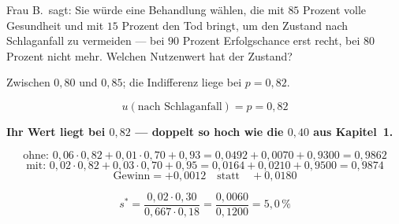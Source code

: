 \begin{aufgabe}
Frau B.\ sagt: Sie würde eine Behandlung wählen, die mit $85$ Prozent volle Gesundheit und mit $15$ Prozent den Tod bringt, um den Zustand nach Schlaganfall zu vermeiden --- bei $90$ Prozent Erfolgschance erst recht, bei $80$ Prozent nicht mehr. Welchen Nutzenwert hat der Zustand?

\loesung
{}
Zwischen $0{,}80$ und $0{,}85$; die Indifferenz liege bei $p = 0{,}82$.

\[ u(\text{nach Schlaganfall}) = p = 0{,}82 \]

\begin{center}
\begin{minipage}{0.9\textwidth}
\textbf{Ihr Wert liegt bei $0{,}82$ --- doppelt so hoch wie die $0{,}40$ aus Kapitel~1.}
\end{minipage}
\end{center}

\[ \text{ohne: } 0{,}06\cdot0{,}82 + 0{,}01\cdot0{,}70 + 0{,}93 = 0{,}0492+0{,}0070+0{,}9300 = 0{,}9862 \]
\[ \text{mit: } 0{,}02\cdot0{,}82 + 0{,}03\cdot0{,}70 + 0{,}95 = 0{,}0164+0{,}0210+0{,}9500 = 0{,}9874 \]
\[ \text{Gewinn} = +0{,}0012 \quad\text{statt}\quad +0{,}0180 \]

\[ s^{*} = \frac{0{,}02\cdot0{,}30}{0{,}667\cdot0{,}18} = \frac{0{,}0060}{0{,}1200} = 5{,}0\,\% \]

\begin{center}
\begin{minipage}{0.88\textwidth}
\end{minipage}
\end{center}
\end{aufgabe}

